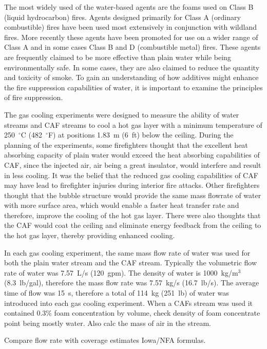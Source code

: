 \documentclass[12pt,oneside]{book}
\begin{document}
The most widely used of the water-based agents are the foams used on Class B (liquid hydrocarbon) fires. Agents designed primarily for Class A (ordinary combustible) fires have been used most extensively in conjunction with wildland fires. More recently these agents have been promoted for use on a wider range of Class A and in some cases Class B and D (combustible metal) fires. These agents are frequently claimed to be more effective than plain water while being environmentally safe. In some cases, they are also claimed to reduce the quantity and toxicity of smoke. To gain an understanding of how additives might enhance the fire suppression capabilities of water, it is important to examine the principles of fire suppression.

The gas cooling experiments were designed to measure the ability of water streams and CAF streams to cool a hot gas layer with a minimum temperature of  250~$^{\circ}$C (482~$^{\circ}$F) at positions 1.83~m (6~ft) below the ceiling. During the planning of the experiments, some firefighters thought that the excellent heat absorbing capacity of plain water would exceed the heat absorbing capabilities of CAF, since the injected air, air being a great insulator, would interfere and result in less cooling. It was the belief that the reduced gas cooling capabilities of CAF may have lead to firefighter injuries during interior fire attacks. Other firefighters thought that the bubble structure would provide the same mass flowrate of water with more surface area, which would enable a faster heat transfer rate and therefore, improve the cooling of the hot gas layer. There were also thoughts that the CAF would coat the ceiling and eliminate energy feedback from the ceiling to the hot gas layer, thereby providing enhanced cooling.

In each gas cooling experiment, the same mass flow rate of water was used for both the plain water stream and the CAF stream. Typically the volumetric flow rate of water was 7.57~L/s (120~gpm). The density of water is 1000~kg/m$^3$ (8.3~lb/gal), therefore the mass flow rate was 7.57~kg/s (16.7~lb/s).  The average time of flow was 15~s, therefore a total of 114~kg (251~lb) of water was introduced into each gas cooling experiment. When a CAFs stream was used it contained 0.3\% foam concentration by volume, check density of foam concentrate   point being mostly water.  Also calc the mass of air in the stream.

Compare flow rate with coverage estimates Iowa/NFA formulas. 
\end{document}
